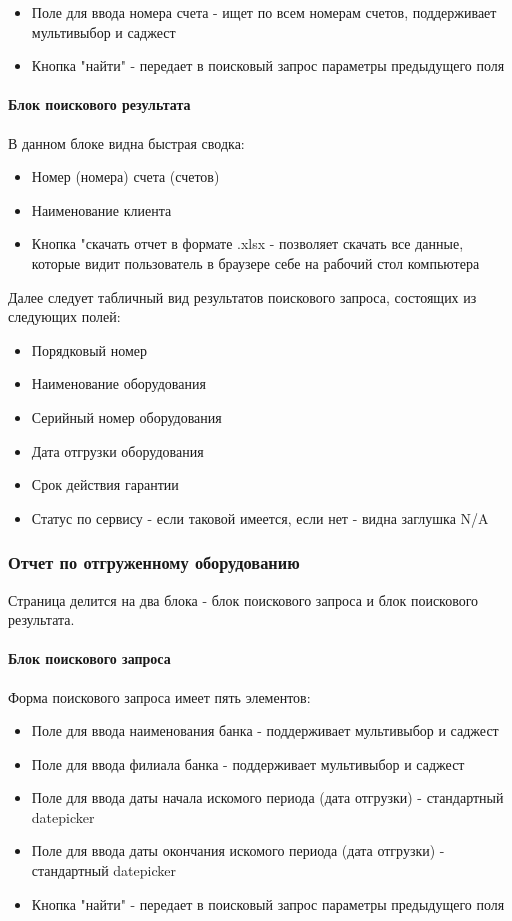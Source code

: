 \documentclass[DIV=calc, paper=a4, fontsize=11pt]{scrartcl} %
\begin{document}
\begin{itemize}
	\item Поле для ввода номера счета - ищет по всем номерам счетов, поддерживает мультивыбор и саджест
	\item Кнопка "найти" - передает в поисковый запрос параметры предыдущего поля
\end{itemize}

\paragraph{Блок поискового результата}
В данном блоке видна быстрая сводка:

\begin{itemize}
	\item Номер (номера) счета (счетов)
	\item Наименование клиента
	\item Кнопка "скачать отчет в формате .xlsx - позволяет скачать все данные, которые видит пользователь в браузере себе на рабочий стол компьютера
\end{itemize}

Далее следует табличный вид результатов поискового запроса, состоящих из следующих полей:

\begin{itemize}
	\item Порядковый номер
	\item Наименование оборудования
	\item Серийный номер оборудования
	\item Дата отгрузки оборудования
	\item Срок действия гарантии
	\item Статус по сервису - если таковой имеется, если нет - видна заглушка N/A
\end{itemize}


\subsubsection{Отчет по отгруженному оборудованию}

Страница делится на два блока - блок поискового запроса и блок поискового результата.
\paragraph{Блок поискового запроса}
Форма поискового запроса имеет пять элементов:

\begin{itemize}
	\item Поле для ввода наименования банка - поддерживает мультивыбор и саджест
	\item Поле для ввода филиала банка - поддерживает мультивыбор и саджест
	\item Поле для ввода даты начала искомого периода (дата отгрузки) - стандартный datepicker
	\item Поле для ввода даты окончания искомого периода (дата отгрузки) - стандартный datepicker
	\item Кнопка "найти" - передает в поисковый запрос параметры предыдущего поля
\end{itemize}
\end{document}

